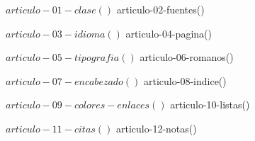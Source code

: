 %
%


${ articulo-01-clase() }

${ articulo-02-fuentes() }

${ articulo-03-idioma() }

${ articulo-04-pagina() }

${ articulo-05-tipografia() }

${ articulo-06-romanos() }

${ articulo-07-encabezado() }

${ articulo-08-indice() }

${ articulo-09-colores-enlaces() }

${ articulo-10-listas() }

${ articulo-11-citas() }

${ articulo-12-notas() }

